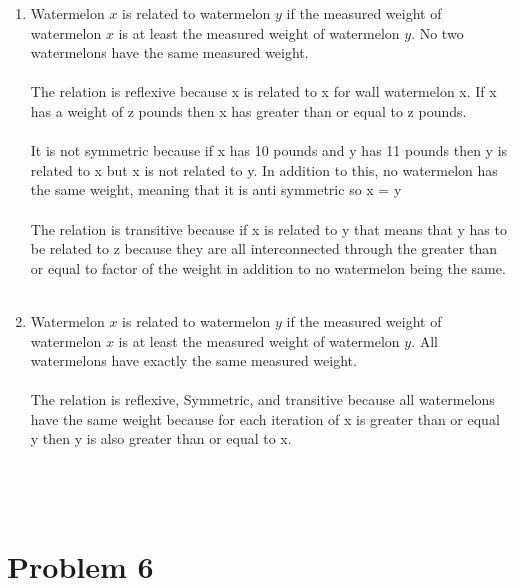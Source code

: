 \begin{enumerate}[label=(\alph*)]
\item Watermelon $x$ is related to watermelon $y$ if the measured weight of watermelon $x$ is at least the measured weight of watermelon $y$. No two watermelons have the same measured weight.\\\\
The relation is reflexive because x is related to x for wall watermelon x. If x has a weight of z pounds then x has greater than or equal to z pounds. \\
\\
It is not symmetric because if x has 10 pounds and y has 11 pounds then y is related to x but x is not related to y. In addition to this, no watermelon has the same weight, meaning that it is anti symmetric so x = y\\
\\
The relation is transitive because if x is related to y that means that y has to be related to z because they are all interconnected through the greater than or equal to factor of the weight in addition to no watermelon being the same.
\\\\
\item Watermelon $x$ is related to watermelon $y$ if the measured weight of watermelon $x$ is at least the measured weight of watermelon $y$. All watermelons have exactly the same measured weight.\\\\
The relation is reflexive, Symmetric, and transitive because all watermelons have the same weight because for each iteration of x is greater than or equal y then y is also greater than or equal to x.\\
\\
\\\\
\end{enumerate}
 \newpage

\section*{Problem 6}
